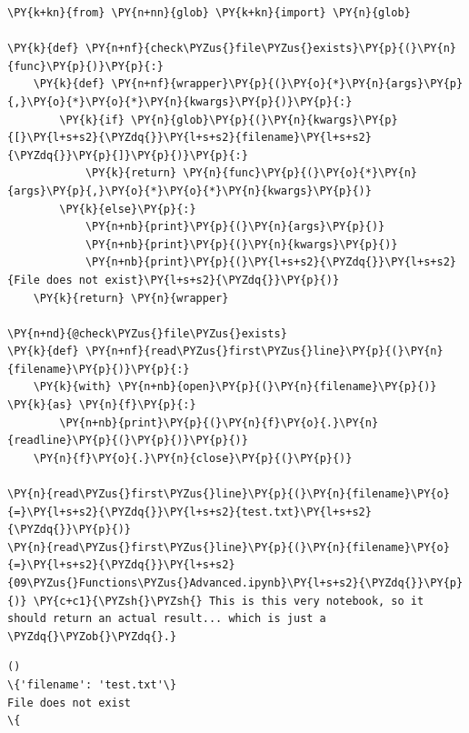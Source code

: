     \begin{tcolorbox}[breakable, size=fbox, boxrule=1pt, pad at break*=1mm,colback=cellbackground, colframe=cellborder]
\begin{Verbatim}[commandchars=\\\{\}]
\PY{k+kn}{from} \PY{n+nn}{glob} \PY{k+kn}{import} \PY{n}{glob}

\PY{k}{def} \PY{n+nf}{check\PYZus{}file\PYZus{}exists}\PY{p}{(}\PY{n}{func}\PY{p}{)}\PY{p}{:}
    \PY{k}{def} \PY{n+nf}{wrapper}\PY{p}{(}\PY{o}{*}\PY{n}{args}\PY{p}{,}\PY{o}{*}\PY{o}{*}\PY{n}{kwargs}\PY{p}{)}\PY{p}{:}
        \PY{k}{if} \PY{n}{glob}\PY{p}{(}\PY{n}{kwargs}\PY{p}{[}\PY{l+s+s2}{\PYZdq{}}\PY{l+s+s2}{filename}\PY{l+s+s2}{\PYZdq{}}\PY{p}{]}\PY{p}{)}\PY{p}{:}
            \PY{k}{return} \PY{n}{func}\PY{p}{(}\PY{o}{*}\PY{n}{args}\PY{p}{,}\PY{o}{*}\PY{o}{*}\PY{n}{kwargs}\PY{p}{)}
        \PY{k}{else}\PY{p}{:}
            \PY{n+nb}{print}\PY{p}{(}\PY{n}{args}\PY{p}{)}
            \PY{n+nb}{print}\PY{p}{(}\PY{n}{kwargs}\PY{p}{)}
            \PY{n+nb}{print}\PY{p}{(}\PY{l+s+s2}{\PYZdq{}}\PY{l+s+s2}{File does not exist}\PY{l+s+s2}{\PYZdq{}}\PY{p}{)}
    \PY{k}{return} \PY{n}{wrapper}

\PY{n+nd}{@check\PYZus{}file\PYZus{}exists}
\PY{k}{def} \PY{n+nf}{read\PYZus{}first\PYZus{}line}\PY{p}{(}\PY{n}{filename}\PY{p}{)}\PY{p}{:}
    \PY{k}{with} \PY{n+nb}{open}\PY{p}{(}\PY{n}{filename}\PY{p}{)} \PY{k}{as} \PY{n}{f}\PY{p}{:}
        \PY{n+nb}{print}\PY{p}{(}\PY{n}{f}\PY{o}{.}\PY{n}{readline}\PY{p}{(}\PY{p}{)}\PY{p}{)}
    \PY{n}{f}\PY{o}{.}\PY{n}{close}\PY{p}{(}\PY{p}{)}

\PY{n}{read\PYZus{}first\PYZus{}line}\PY{p}{(}\PY{n}{filename}\PY{o}{=}\PY{l+s+s2}{\PYZdq{}}\PY{l+s+s2}{test.txt}\PY{l+s+s2}{\PYZdq{}}\PY{p}{)}
\PY{n}{read\PYZus{}first\PYZus{}line}\PY{p}{(}\PY{n}{filename}\PY{o}{=}\PY{l+s+s2}{\PYZdq{}}\PY{l+s+s2}{09\PYZus{}Functions\PYZus{}Advanced.ipynb}\PY{l+s+s2}{\PYZdq{}}\PY{p}{)} \PY{c+c1}{\PYZsh{}\PYZsh{} This is this very notebook, so it should return an actual result... which is just a \PYZdq{}\PYZob{}\PYZdq{}.}
\end{Verbatim}
\end{tcolorbox}

    \begin{Verbatim}[commandchars=\\\{\}]
()
\{'filename': 'test.txt'\}
File does not exist
\{

    \end{Verbatim}

